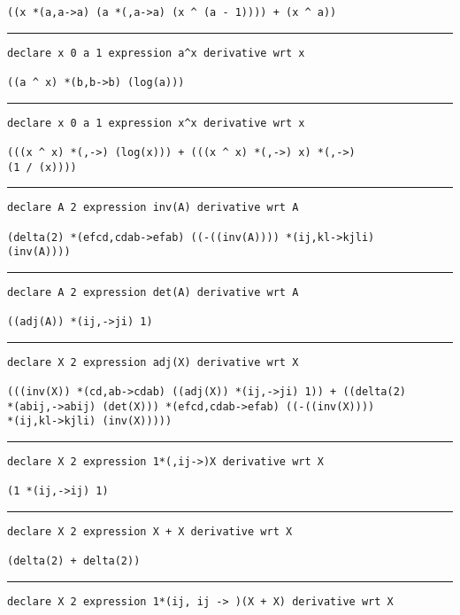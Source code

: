 \documentclass[12pt, a4paper]{report}
\begin{document}
\begin{multicols}{2}
\begin{verbatim}
((x *(a,a->a) (a *(,a->a) (x ^ (a - 1)))) + (x ^ a))
\end{verbatim}
\vspace{-20pt} \rule[-10pt]{\columnwidth}{0.1pt} 
\begin{verbatim}
declare x 0 a 1 expression a^x derivative wrt x

((a ^ x) *(b,b->b) (log(a)))
\end{verbatim}
\vspace{-20pt} \rule[-10pt]{\columnwidth}{0.1pt} 
\begin{verbatim}
declare x 0 a 1 expression x^x derivative wrt x

(((x ^ x) *(,->) (log(x))) + (((x ^ x) *(,->) x) *(,->) 
(1 / (x))))
\end{verbatim}
\vspace{-20pt} \rule[-10pt]{\columnwidth}{0.1pt} 
\begin{verbatim}
declare A 2 expression inv(A) derivative wrt A

(delta(2) *(efcd,cdab->efab) ((-((inv(A)))) *(ij,kl->kjli) 
(inv(A))))
\end{verbatim}
\vspace{-20pt} \rule[-10pt]{\columnwidth}{0.1pt} 
\begin{verbatim}
declare A 2 expression det(A) derivative wrt A

((adj(A)) *(ij,->ji) 1)
\end{verbatim}
\vspace{-20pt} \rule[-10pt]{\columnwidth}{0.1pt} 
\begin{verbatim}
declare X 2 expression adj(X) derivative wrt X

(((inv(X)) *(cd,ab->cdab) ((adj(X)) *(ij,->ji) 1)) + ((delta(2) 
*(abij,->abij) (det(X))) *(efcd,cdab->efab) ((-((inv(X)))) 
*(ij,kl->kjli) (inv(X)))))
\end{verbatim}
\vspace{-20pt} \rule[-10pt]{\columnwidth}{0.1pt} 
\begin{verbatim}
declare X 2 expression 1*(,ij->)X derivative wrt X

(1 *(ij,->ij) 1)
\end{verbatim}
\vspace{-20pt} \rule[-10pt]{\columnwidth}{0.1pt} 
\begin{verbatim}
declare X 2 expression X + X derivative wrt X

(delta(2) + delta(2))
\end{verbatim}
\vspace{-20pt} \rule[-10pt]{\columnwidth}{0.1pt} 
\begin{verbatim}
declare X 2 expression 1*(ij, ij -> )(X + X) derivative wrt X


\end{verbatim}
\end{multicols}
\end{document}

